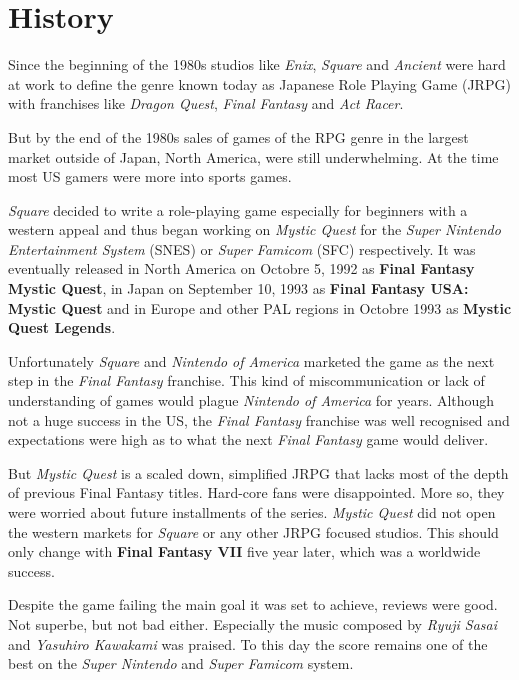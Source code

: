 \chapter{History}

Since the beginning of the 1980s studios like \textit{Enix}, \textit{Square} and \textit{Ancient} were hard at work to define the genre known today as Japanese Role Playing Game (JRPG) with franchises like \textit{Dragon Quest}, \textit{Final Fantasy} and \textit{Act Racer}.

But by the end of the 1980s sales of games of the RPG genre in the largest market outside of Japan, North America, were still underwhelming. At the time most US gamers were more into sports games.

\textit{Square} decided to write a role-playing game especially for beginners with a western appeal and thus began working on \textit{Mystic Quest} for the \textit{Super Nintendo Entertainment System} (SNES) or \textit{Super Famicom} (SFC) respectively. It was eventually released in North America on Octobre 5, 1992 as \textbf{Final Fantasy Mystic Quest}, in Japan on September 10, 1993 as \textbf{Final Fantasy USA: Mystic Quest} and in Europe and other PAL regions in Octobre 1993 as \textbf{Mystic Quest Legends}. 

Unfortunately \textit{Square} and \textit{Nintendo of America} marketed the game as the next step in the \textit{Final Fantasy} franchise. This kind of miscommunication or lack of understanding of games would plague \textit{Nintendo of America} for years. Although not a huge success in the US, the \textit{Final Fantasy} franchise was well recognised and expectations were high as to what the next \textit{Final Fantasy} game would deliver. 

But \textit{Mystic Quest} is a scaled down, simplified JRPG that lacks most of the depth of previous Final Fantasy titles. Hard-core fans were disappointed. More so, they were worried about future installments of the series. \textit{Mystic Quest} did not open the western markets for \textit{Square} or any other JRPG focused studios. This should only change with \textbf{Final Fantasy VII} five year later, which was a worldwide success.

Despite the game failing the main goal it was set to achieve, reviews were good. Not superbe, but not bad either. Especially the music composed by \textit{Ryuji Sasai} and \textit{Yasuhiro Kawakami} was praised. To this day the score remains one of the best on the \textit{Super Nintendo} and \textit{Super Famicom} system.


